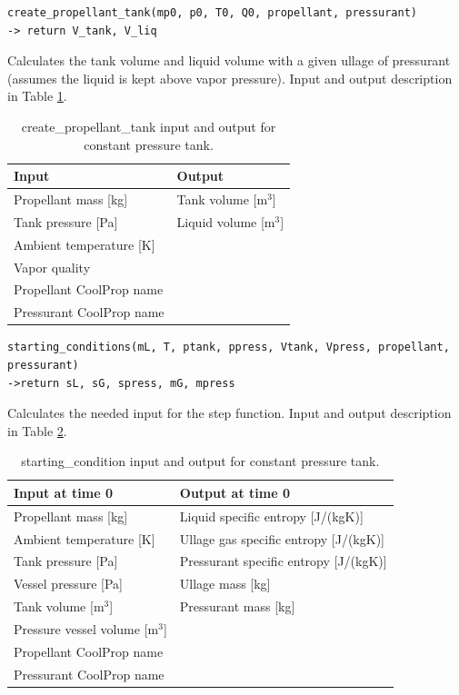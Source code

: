 \begin{verbatim}
create_propellant_tank(mp0, p0, T0, Q0, propellant, pressurant)
-> return V_tank, V_liq
\end{verbatim}
\hspace*{2em} Calculates the tank volume and liquid volume with a given ullage of pressurant (assumes the liquid is kept above vapor pressure). Input and output description in Table \ref{Tab: CreateProp}.
\begin{table}[h!]
\centering
\begin{tabular}{l|l}
\hline
\textbf{Input} & \textbf{Output}\\
\hline
Propellant mass [kg] & Tank volume [m$^3$]\\
Tank pressure [Pa] & Liquid volume [m$^3$]\\
Ambient temperature [K] & \\
Vapor quality & \\
Propellant CoolProp name & \\
Pressurant CoolProp name & \\
\hline
\end{tabular}
\caption{create\_propellant\_tank input and output for constant pressure tank.}
\label{Tab: CreateProp}
\end{table}

\begin{verbatim}
starting_conditions(mL, T, ptank, ppress, Vtank, Vpress, propellant, pressurant)
->return sL, sG, spress, mG, mpress
\end{verbatim}
\hspace*{2em} Calculates the needed input for the step function. Input and output description in Table \ref{Tab: StartingPress}.
\begin{table}[h!]
\centering
\begin{tabular}{l|l}
\hline
\textbf{Input at time 0} & \textbf{Output at time 0}\\
\hline
Propellant mass [kg] & Liquid specific entropy [J/(kgK)] \\
Ambient temperature [K] & Ullage gas specific entropy [J/(kgK)] \\
Tank pressure [Pa] & Pressurant specific entropy [J/(kgK)]\\
Vessel pressure [Pa] & Ullage mass [kg]\\
Tank volume [m$^3$] & Pressurant mass [kg]\\
Pressure vessel volume [m$^3$] & \\
Propellant CoolProp name & \\
Pressurant CoolProp name & \\
\hline
\end{tabular}
\caption{starting\_condition input and output for constant pressure tank.}
\label{Tab: StartingPress}
\end{table}

